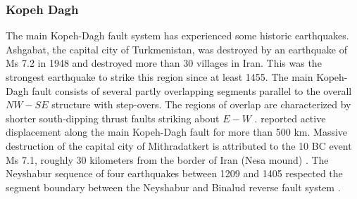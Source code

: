 \subsubsection{Kopeh Dagh}
The main Kopeh-Dagh fault system has experienced some historic earthquakes. Ashgabat, the capital city of Turkmenistan, was destroyed by an earthquake of Ms 7.2 in 1948 and destroyed more than 30 villages in Iran. This was the strongest earthquake to strike this region since at least 1455.
The main Kopeh-Dagh fault consists of several partly overlapping segments parallel to the overall $NW - SE$ structure with step-overs. The regions of overlap are characterized by shorter south-dipping thrust faults striking about $E - W$ \citep{Berberian2001}. \citet{Trifonov1978} reported active displacement along the main Kopeh-Dagh fault for more than 500 km. 
Massive destruction of the capital city of Mithradatkert is attributed to the 10 BC event Ms 7.1, roughly 30 kilometers from the border of Iran (Nesa mound) \citep{Berberian2001}.
The Neyshabur sequence of four earthquakes between 1209 and 1405 respected the segment boundary between the Neyshabur and Binalud reverse fault system \citep{Berberian1999}.





\newpage
